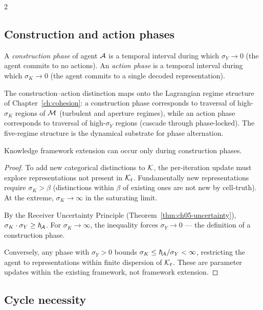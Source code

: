 \begin{multicols}{2}
\subsection{Construction and action phases}

\begin{definition}\label{def:ch05-phases}
A \emph{construction phase} of agent $\mathcal{A}$ is a temporal interval during which
$\sigma_Y \to 0$ (the agent commits to no actions). An \emph{action phase} is a temporal
interval during which $\sigma_K \to 0$ (the agent commits to a single decoded
representation).
\end{definition}

The construction--action distinction maps onto the Lagrangian regime structure of
Chapter~\ref{ch:cohesion}: a construction phase corresponds to traversal of
high-$\sigma_K$ regions of $\mathcal{M}$ (turbulent and aperture regimes), while an action
phase corresponds to traversal of high-$\sigma_Y$ regions (cascade through phase-locked).
The five-regime structure is the dynamical substrate for phase alternation.

\begin{theorem}\label{thm:ch05-t2}
Knowledge framework extension can occur only during construction phases.
\end{theorem}

\begin{proof}
To add new categorical distinctions to $\mathcal{K}$, the per-iteration update must explore
representations not present in $\mathcal{K}_t$. Fundamentally new representations require
$\sigma_K > \beta$ (distinctions within $\beta$ of existing ones are not new by
cell-truth). At the extreme, $\sigma_K \to \infty$ in the saturating limit.

By the Receiver Uncertainty Principle (Theorem~\ref{thm:ch05-uncertainty}),
$\sigma_K \cdot \sigma_Y \ge \hbar_{\!\mathcal{A}}$. For $\sigma_K \to \infty$, the inequality forces
$\sigma_Y \to 0$ --- the definition of a construction phase.

Conversely, any phase with $\sigma_Y > 0$ bounds $\sigma_K \le \hbar_{\!\mathcal{A}}/\sigma_Y < \infty$,
restricting the agent to representations within finite dispersion of $\mathcal{K}_t$. These are
parameter updates within the existing framework, not framework extension.
\end{proof}

\subsection{Cycle necessity}


\end{multicols}
